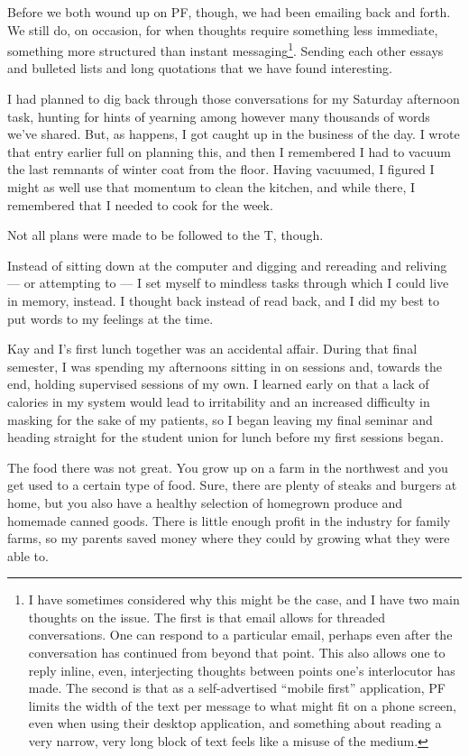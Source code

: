 Before we both wound up on PF, though, we had been emailing back and forth. We still do, on occasion, for when thoughts require something less immediate, something more structured than instant messaging\footnote{I have sometimes considered why this might be the case, and I have two main thoughts on the issue. The first is that email allows for threaded conversations. One can respond to a particular email, perhaps even after the conversation has continued from beyond that point. This also allows one to reply inline, even, interjecting thoughts between points one's interlocutor has made. The second is that as a self-advertised ``mobile first'' application, PF limits the width of the text per message to what might fit on a phone screen, even when using their desktop application, and something about reading a very narrow, very long block of text feels like a misuse of the medium.}. Sending each other essays and bulleted lists and long quotations that we have found interesting.

I had planned to dig back through those conversations for my Saturday afternoon task, hunting for hints of yearning among however many thousands of words we've shared. But, as happens, I got caught up in the business of the day. I wrote that entry earlier full on planning this, and then I remembered I had to vacuum the last remnants of winter coat from the floor. Having vacuumed, I figured I might as well use that momentum to clean the kitchen, and while there, I remembered that I needed to cook for the week.

Not all plans were made to be followed to the T, though.

Instead of sitting down at the computer and digging and rereading and reliving --- or attempting to --- I set myself to mindless tasks through which I could live in memory, instead. I thought back instead of read back, and I did my best to put words to my feelings at the time.

Kay and I's first lunch together was an accidental affair. During that final semester, I was spending my afternoons sitting in on sessions and, towards the end, holding supervised sessions of my own. I learned early on that a lack of calories in my system would lead to irritability and an increased difficulty in masking for the sake of my patients, so I began leaving my final seminar and heading straight for the student union for lunch before my first sessions began.

The food there was not great. You grow up on a farm in the northwest and you get used to a certain type of food. Sure, there are plenty of steaks and burgers at home, but you also have a healthy selection of homegrown produce and homemade canned goods. There is little enough profit in the industry for family farms, so my parents saved money where they could by growing what they were able to.


